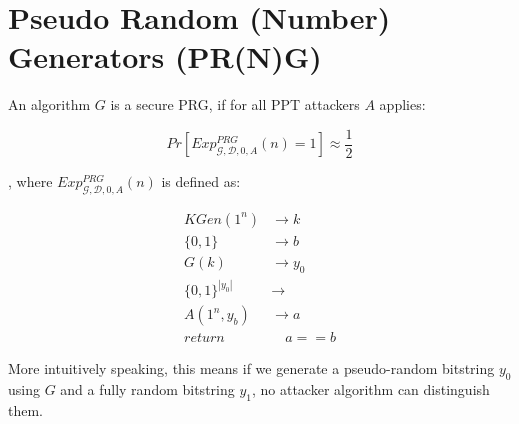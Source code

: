 \section{Pseudo Random (Number) Generators (PR(N)G)}

An algorithm $G$ is a secure PRG, if for all PPT attackers $A$ applies:

$$
    Pr[Exp_{\mathcal{G,D,0}, A}^{PRG}(n) = 1] \approx \frac{1}{2}
$$

, where $Exp_{\mathcal{G,D,0}, A}^{PRG}(n)$ is defined as:

\begin{align}
    KGen(1^n)        & \rightarrow k   \\
    \{0, 1\}         & \rightarrow b   \\
    G(k)             & \rightarrow y_0 \\
    \{0, 1\}^{|y_0|} & \rightarrow     \\
    A(1^n, y_b)      & \rightarrow a   \\
    return           & \quad a == b
\end{align}

More intuitively speaking, this means if we generate a pseudo-random bitstring $y_0$ using $G$ and a fully random bitstring $y_1$, no attacker algorithm can distinguish them.
